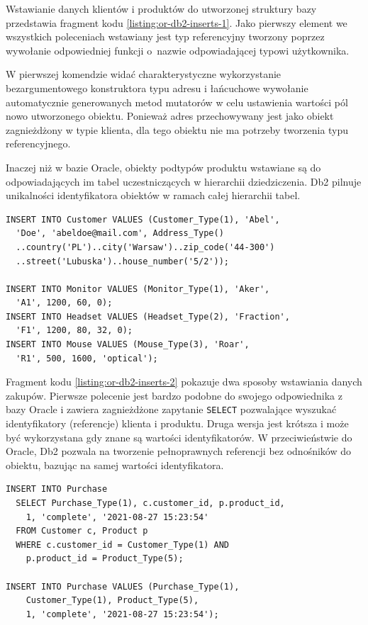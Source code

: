 \documentclass[a4paper,twoside,12pt]{book}
\begin{document}
Wstawianie danych klientów i produktów do utworzonej struktury bazy przedstawia fragment kodu \ref{listing:or-db2-inserts-1}. Jako pierwszy element we wszystkich poleceniach wstawiany jest typ referencyjny tworzony poprzez wywołanie odpowiedniej funkcji o~nazwie odpowiadającej typowi użytkownika.

W pierwszej komendzie widać charakterystyczne wykorzystanie bezargumentowego konstruktora typu adresu i łańcuchowe wywołanie automatycznie generowanych metod mutatorów w celu ustawienia wartości pól nowo utworzonego obiektu. Ponieważ adres przechowywany jest jako obiekt zagnieżdżony w typie klienta, dla tego obiektu nie ma potrzeby tworzenia typu referencyjnego.

Inaczej niż w bazie Oracle, obiekty podtypów produktu wstawiane są do odpowiadających im tabel uczestniczących w hierarchii dziedziczenia. Db2 pilnuje unikalności identyfikatora obiektów w ramach całej hierarchii tabel.

\begin{lstlisting}[style=SQL, caption={Wstawianie danych klientów i produktów do bazy Db2.}, label={listing:or-db2-inserts-1}, captionpos=b]
INSERT INTO Customer VALUES (Customer_Type(1), 'Abel', 
  'Doe', 'abeldoe@mail.com', Address_Type()
  ..country('PL')..city('Warsaw')..zip_code('44-300')
  ..street('Lubuska')..house_number('5/2'));

INSERT INTO Monitor VALUES (Monitor_Type(1), 'Aker', 
  'A1', 1200, 60, 0);
INSERT INTO Headset VALUES (Headset_Type(2), 'Fraction', 
  'F1', 1200, 80, 32, 0);
INSERT INTO Mouse VALUES (Mouse_Type(3), 'Roar', 
  'R1', 500, 1600, 'optical');
\end{lstlisting}

Fragment kodu \ref{listing:or-db2-inserts-2} pokazuje dwa sposoby wstawiania danych zakupów. Pierwsze polecenie jest bardzo podobne do swojego odpowiednika z bazy Oracle i zawiera zagnieżdżone zapytanie \lstinline{SELECT} pozwalające wyszukać identyfikatory (referencje) klienta i produktu. Druga wersja jest krótsza i może być wykorzystana gdy znane są wartości identyfikatorów. W przeciwieństwie do Oracle, Db2 pozwala na tworzenie pełnoprawnych referencji bez odnośników do obiektu, bazując na samej wartości identyfikatora.

\begin{lstlisting}[style=SQL, caption={Wstawianie danych zakupów do bazy Db2.}, label={listing:or-db2-inserts-2}, captionpos=b]
INSERT INTO Purchase
  SELECT Purchase_Type(1), c.customer_id, p.product_id, 
    1, 'complete', '2021-08-27 15:23:54'
  FROM Customer c, Product p 
  WHERE c.customer_id = Customer_Type(1) AND 
    p.product_id = Product_Type(5);

INSERT INTO Purchase VALUES (Purchase_Type(1), 
    Customer_Type(1), Product_Type(5), 
    1, 'complete', '2021-08-27 15:23:54');
\end{lstlisting}
\end{document}
